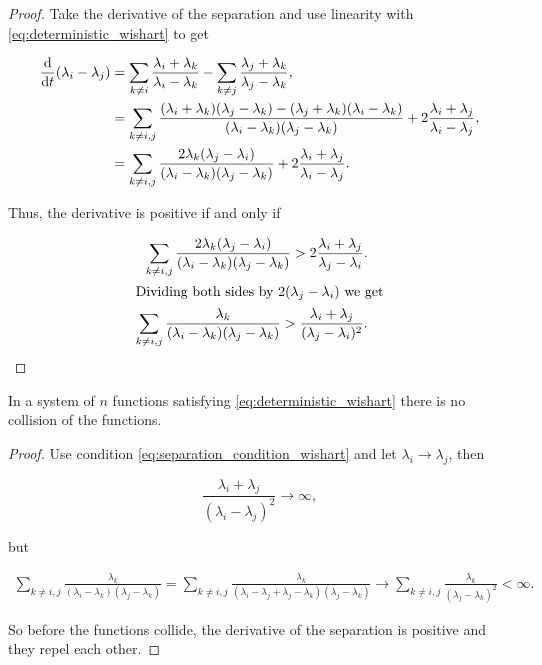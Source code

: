 \begin{proof}

    Take the derivative of the separation and use linearity with \eqref{eq:deterministic_wishart} to get

    \begin{align*}
        \frac{\mathrm d}{\mathrm d t}(\lambda_i - \lambda_j) &= \sum_{k\neq i} \frac{\lambda_i + \lambda_k}{\lambda_i - \lambda_k} - \sum_{k\neq j} \frac{\lambda_j + \lambda_k}{\lambda_j - \lambda_k}, \\
        &= \sum_{k \neq i,j} \frac{ (\lambda_i + \lambda_k)(\lambda_j - \lambda_k) - (\lambda_j + \lambda_k)(\lambda_i - \lambda_k) }{(\lambda_i - \lambda_k)(\lambda_j - \lambda_k)} + 2\frac{\lambda_i + \lambda_j}{\lambda_i - \lambda_j},\\
        &= \sum_{k\neq i,j} \frac{2\lambda_k(\lambda_j - \lambda_i)}{(\lambda_i-\lambda_k)(\lambda_j-\lambda_k)} + 2 \frac{\lambda_i + \lambda_j}{\lambda_i - \lambda_j}.
    \end{align*}

    Thus, the derivative is positive if and only if 

    \begin{align*}
        \sum_{k\neq i,j} \frac{2\lambda_k(\lambda_j - \lambda_i)}{(\lambda_i-\lambda_k)(\lambda_j-\lambda_k)} > 2 \frac{\lambda_i + \lambda_j}{\lambda_j - \lambda_i}.\\
        \intertext{Dividing both sides by $2(\lambda_j - \lambda_i)$ we get}
        \sum_{k\neq i,j} \frac{\lambda_k}{(\lambda_i-\lambda_k)(\lambda_j-\lambda_k)} >  \frac{\lambda_i + \lambda_j}{(\lambda_j - \lambda_i)^2}.
    \end{align*}
\end{proof}

\begin{corollary}
    In a system of $n$ functions satisfying \eqref{eq:deterministic_wishart} there is no collision of the functions.
\end{corollary}

\begin{proof}
    Use condition \eqref{eq:separation_condition_wishart} and let $\lambda_i \to \lambda_j$, then

    \begin{equation*}
        \frac{\lambda_i + \lambda_j}{(\lambda_i-\lambda_j)^2} \to \infty,
    \end{equation*}

    \noindent but

    \begin{align*}
        \sum_{k\neq i,j} \frac{\lambda_k}{(\lambda_i-\lambda_k)(\lambda_j-\lambda_k)} = \sum_{k\neq i,j} \frac{\lambda_k}{(\lambda_i-\lambda_j + \lambda_j -\lambda_k)(\lambda_j-\lambda_k)} \to \sum_{k\neq i,j} \frac{\lambda_k}{(\lambda_j-\lambda_k)^2} < \infty.
    \end{align*}

    So before the functions collide, the derivative of the separation is positive and they repel each other.
\end{proof}


